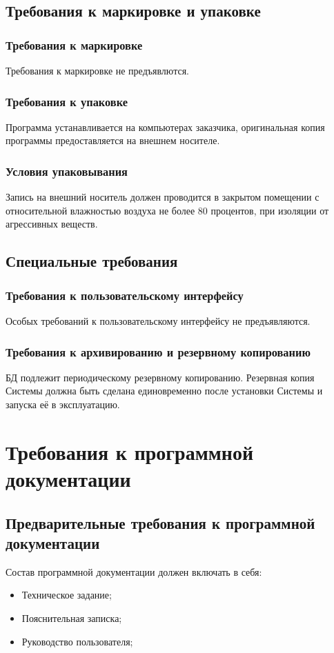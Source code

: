   \subsection{Требования к маркировке и упаковке}
    \subsubsection{Требования к маркировке}
      Требования к маркировке не предъявлются.
    \subsubsection{Требования к упаковке}
      Программа устанавливается на компьютерах заказчика, оригинальная копия программы предоставляется на внешнем носителе.
    \subsubsection{Условия упаковывания}
      Запись на внешний носитель должен проводится в закрытом помещении с относительной влажностью воздуха не более 80 процентов, при изоляции от агрессивных веществ.
  \subsection{Специальные требования}
    \subsubsection{Требования к пользовательскому интерфейсу}
      Особых требований к пользовательскому интерфейсу не предъявляются.
    \subsubsection{Требования к архивированию и резервному копированию}
      БД подлежит периодическому резервному копированию. Резервная копия Системы должна быть сделана единовременно после установки Системы и запуска её в эксплуатацию.
\section{Требования к программной документации}
  \subsection{Предварительные требования к программной документации}
    Состав программной документации должен включать в себя:
    \begin{itemize}
    \item Техническое задание;
    \item Пояснительная записка;
    \item Руководство пользователя;
    \end{itemize}
